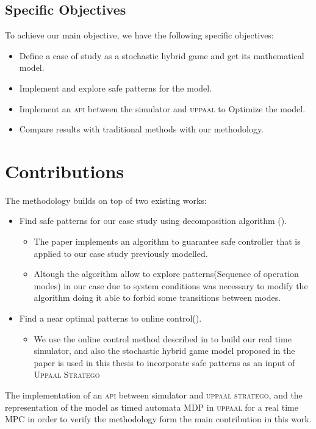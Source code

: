         \subsection*{Specific Objectives}
        To achieve our main objective, we have the following specific objectives:
        \begin{itemize}
            \item Define a case of study as a stochastic hybrid game and get its mathematical model.
            \item Implement and explore safe patterns for the model.
            \item Implement an \textsc{api} between the simulator and \textsc{uppaal} to Optimize the model.
            \item Compare results with traditional methods with our methodology.
        \end{itemize}


    \section{Contributions}
    \label{sec:contributions}
        The methodology builds on top of two existing works:      
        \begin{itemize}
            \item Find safe patterns for our case study using
            decomposition algorithm (\cite{le2017improved}).
                \begin{itemize}
                    \item The paper \cite{le2017improved} implements an algorithm to guarantee safe 
                    controller that is applied to our case study previously modelled.
                    \item Altough the algorithm allow to explore patterns(Sequence of operation modes) 
                    in our case due to system conditions was necessary to modify the 
                    algorithm doing it able to forbid some transitions between modes.                  
                \end{itemize}
            \item Find a near optimal patterns to online control(\cite{larsen2016online}).
            \begin{itemize}
                \item We use the online control method described in \cite{larsen2016online} to build our real time simulator, and also 
                the stochastic hybrid game model proposed in the paper is used in this thesis 
                to incorporate safe patterns as an input of \textsc{Uppaal Stratego}                
            \end{itemize}            
        \end{itemize}
        The implementation of an \textsc{api} between simulator and \textsc{uppaal stratego}, and 
        the representation of the model as timed automata \ac{MDP} in \textsc{uppaal} 
        for a real time \ac{MPC} in order to verify the methodology form 
        the main contribution in this work.            

